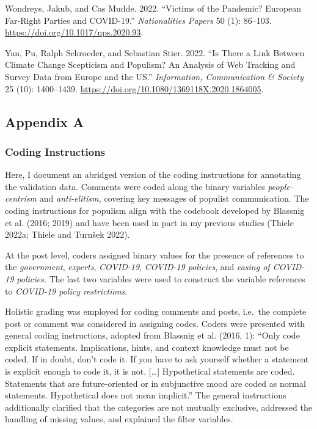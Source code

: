 \documentclass[
]{ccr}
\newlength{\cslhangindent}
\newlength{\cslentryspacingunit} %
\newenvironment{CSLReferences}[2] %
 {%
  \setlength{\parindent}{0pt}
  \ifodd #1
  \let\oldpar\par
  \def\par{\hangindent=\cslhangindent\oldpar}
  \fi
  \setlength{\parskip}{#2\cslentryspacingunit}
 }%
 {}
\begin{document}
\begin{CSLReferences}{1}{0}
\leavevmode{}%
Wondreys, Jakub, and Cas Mudde. 2022. {``Victims of the {Pandemic}?
{European Far-Right Parties} and {COVID-19}.''} \emph{Nationalities
Papers} 50 (1): 86--103. \url{https://doi.org/10.1017/nps.2020.93}.

\leavevmode{}%
Yan, Pu, Ralph Schroeder, and Sebastian Stier. 2022. {``Is There a Link
Between Climate Change Scepticism and Populism? {An} Analysis of Web
Tracking and Survey Data from {Europe} and the {US}.''}
\emph{Information, Communication \& Society} 25 (10): 1400--1439.
\url{https://doi.org/10.1080/1369118X.2020.1864005}.

\end{CSLReferences}

\newpage
\appendix
\renewcommand{\thefigure}{A\arabic{figure}}
\renewcommand{\thetable}{A\arabic{table}}
\setcounter{figure}{0}
\setcounter{table}{0}

\hypertarget{appendix-a}{%
\subsection{Appendix A}\label{appendix-a}}

\hypertarget{coding-instructions}{%
\subsubsection{Coding Instructions}\label{coding-instructions}}

Here, I document an abridged version of the coding instructions for
annotating the validation data. Comments were coded along the binary
variables \emph{people-centrism} and \emph{anti-elitism,} covering key
messages of populist communication. The coding instructions for populism
align with the codebook developed by Blassnig et al. (2016; 2019) and
have been used in part in my previous studies (Thiele 2022a; Thiele and
Turnšek 2022).

At the post level, coders assigned binary values for the presence of
references to the \emph{government}, \emph{experts}, \emph{COVID-19},
\emph{COVID-19 policies}, and \emph{easing of COVID-19 policies.} The
last two variables were used to construct the variable references to
\emph{COVID-19 policy restrictions}.

Holistic grading was employed for coding comments and posts, i.e.~the
complete post or comment was considered in assigning codes. Coders were
presented with general coding instructions, adopted from Blassnig et al.
(2016, 1): ``Only code explicit statements. Implications, hints, and
context knowledge must not be coded. If in doubt, don't code it. If you
have to ask yourself whether a statement is explicit enough to code it,
it is not. {[}\ldots{]} Hypothetical statements are coded. Statements
that are future-oriented or in subjunctive mood are coded as normal
statements. Hypothetical does not mean implicit.'' The general
instructions additionally clarified that the categories are not mutually
exclusive, addressed the handling of missing values, and explained the
filter variables.
\end{document}
